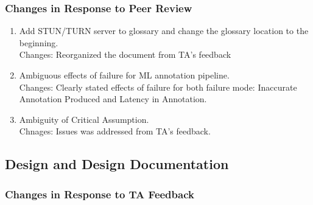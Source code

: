 \documentclass{article}
\begin{document}
\subsubsection{Changes in Response to Peer Review}
\begin{enumerate}
        \item Add STUN/TURN server to glossary and change the glossary location to the beginning.\\
                Changes: Reorganized the document from TA's feedback
        \item Ambiguous effects of failure for ML annotation pipeline.\\
                Changes: Clearly stated effects of failure for both failure mode: Inaccurate Annotation Produced and Latency in
                Annotation.
        \item Ambiguity of Critical Assumption.\\
                Chnages: Issues was addressed from TA's feedback.        
\end{enumerate}

\subsection{Design and Design Documentation}

\subsubsection{Changes in Response to TA Feedback}
\end{document}
